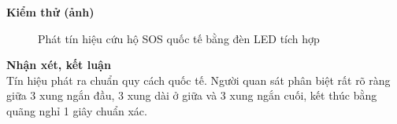 \noindent\textbf{Kiểm thử (ảnh)}\\
\begin{figure}[H]
    \centering
    \caption{Phát tín hiệu cứu hộ SOS quốc tế bằng đèn LED tích hợp}
    \label{fig:bt16}
\end{figure}

\noindent\textbf{Nhận xét, kết luận}\\
Tín hiệu phát ra chuẩn quy cách quốc tế. Người quan sát phân biệt rất rõ ràng giữa 3 xung ngắn đầu, 3 xung dài ở giữa và 3 xung ngắn cuối, kết thúc bằng quãng nghỉ 1 giây chuẩn xác.
